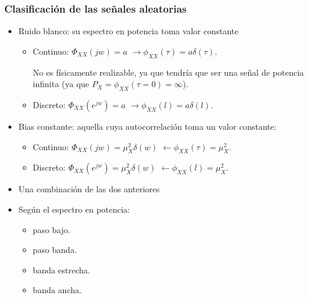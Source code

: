 \documentclass{beamer}
\numberwithin{section}{part}
\begin{document}
\begin{frame}
  \frametitle{Clasificación de las señales aleatorias}
  \vspace{-0.2cm}
  \footnotesize
  \begin{itemize}
    \footnotesize
    \item Ruido blanco: su espectro en potencia toma valor constante
    \begin{itemize}
    \footnotesize
    \scriptsize
    \item Continuo: $\Phi_{XX}(jw)=a$   $\rightarrow \phi_{XX}(\tau)=a\delta(\tau)$.
    
    \vspace{0.1cm}
    
    No es físicamente realizable, ya que tendría que ser una señal de potencia infinita (ya que $P_X=\phi_{XX}(\tau=0)=\infty$). 
    
    \vspace{0.1cm}
    
    \item Discreto: $\Phi_{XX}(e^{jw})=a $  $\rightarrow \phi_{XX}(l)=a \delta(l)$.
    
    
    \end{itemize}
    
    \item Bias constante: aquella cuya autocorrelación toma un valor constante:
    \begin{itemize}
      \footnotesize
      \scriptsize
      \item Continuo: $\Phi_{XX}(jw)=\mu^2_X \delta(w)$   $\leftarrow \phi_{XX}(\tau)=\mu^2_X$.
      
      \vspace{0.1cm}
      
      \item Discreto: $\Phi_{XX}(e^{jw})=\mu^2_X \delta(w)$   $\leftarrow \phi_{XX}(l)=\mu^2_X$.
      \vspace{0.1cm}    
    \end{itemize}
    \item Una combinación de las dos anteriores    
    \item Según el espectro en potencia:
    \begin{itemize}\scriptsize
      \item paso bajo.
      \item paso banda.
      \item banda estrecha.
      \item banda ancha.
    \end{itemize}
  \end{itemize}
\end{frame}
  
\end{document}
